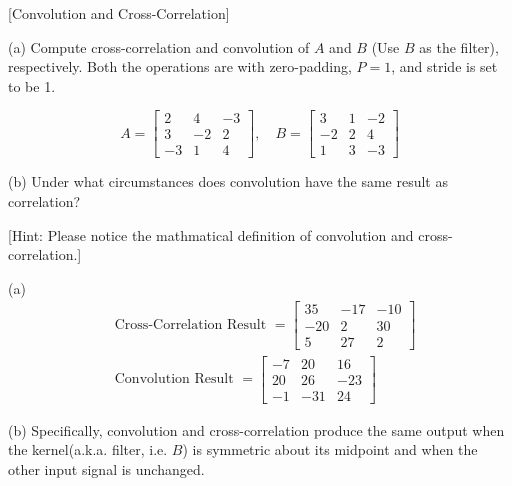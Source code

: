 \item {} [Convolution and Cross-Correlation]

(a) Compute cross-correlation and convolution of $A$ and $B$ (Use $B$ as the filter), respectively. Both the operations are with zero-padding, $P=1$, and stride is set to be 1. 

$$
A=\left[\begin{array}{ccc}
2 & 4 & -3 \\
3 & -2 & 2 \\
-3 & 1 & 4
\end{array}\right], \quad B=\left[\begin{array}{ccc}
3 & 1 & -2 \\
-2 & 2 & 4 \\
1 & 3 & -3
\end{array}\right]
$$

(b) Under what circumstances does convolution have the same result as correlation? 

[Hint: Please notice the mathmatical definition of convolution and cross-correlation.]

\solution

(a) \begin{align*}
& \text {Cross-Correlation Result }=\left[\begin{array}{ccc}
35 & -17 & -10 \\
-20 & 2 & 30 \\
5 & 27 & 2
\end{array}\right] \\
& \text {Convolution Result }=\left[\begin{array}{ccc}
-7 & 20 & 16 \\
20 & 26 & -23 \\
-1 & -31 & 24
\end{array}\right]
\end{align*}

(b) Specifically, convolution and cross-correlation produce the same output when the kernel(a.k.a. filter, i.e. $B$) is symmetric about its midpoint and when the other input signal is unchanged.

\newpage